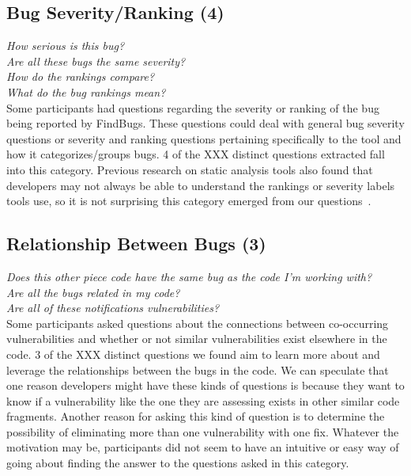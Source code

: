 \documentclass[conference]{IEEEtran}
\begin{document}
\noindent\subsection{\textbf{Bug Severity/Ranking (4)}}

\noindent\emph{How serious is this bug?} \\
\emph{Are all these bugs the same severity?} \\
\emph{How do the rankings compare?} \\
\emph{What do the bug rankings mean?} \\

Some participants had questions regarding the severity or ranking of the bug being reported by FindBugs. These questions could deal with general bug severity questions or severity and ranking questions pertaining specifically to the tool and how it categorizes/groups bugs. 4 of the XXX distinct questions extracted fall into this category. Previous research on static analysis tools also found that developers may not always be able to understand the rankings or severity labels tools use, so it is not surprising this category emerged from our questions~\cite{johnson2013don}.


\noindent\subsection{\textbf{Relationship Between Bugs (3)}}

\noindent\emph{Does this other piece code have the same bug as the code I'm working with?} \\
\emph{Are all the bugs related in my code?} \\
\emph{Are all of these notifications vulnerabilities?} \\

Some participants asked questions about the connections between co-occurring vulnerabilities and whether or not similar vulnerabilities exist elsewhere in the code. 3 of the XXX distinct questions we found aim to learn more about and leverage the relationships between the bugs in the code. We can speculate that one reason developers might have these kinds of questions is because they want to know if a vulnerability like the one they are assessing exists in other similar code fragments. Another reason for asking this kind of question is to determine the possibility of eliminating more than one vulnerability with one fix. Whatever the motivation may be, participants did not seem to have an intuitive or easy way of going about finding the answer to the questions asked in this category.
\end{document}
